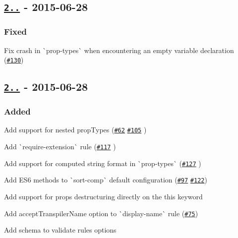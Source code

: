 \subsection*{\href{https://github.com/yannickcr/eslint-plugin-react/compare/v2.6.0...v2.6.1}{\tt 2..} -\/ 2015-\/06-\/28}

\subsubsection*{Fixed}


\begin{DoxyItemize}
\item Fix crash in \`{}prop-\/types\`{} when encountering an empty variable declaration (\href{https://github.com/yannickcr/eslint-plugin-react/issues/130}{\tt \#130})
\end{DoxyItemize}

\subsection*{\href{https://github.com/yannickcr/eslint-plugin-react/compare/v2.5.2...v2.6.0}{\tt 2..} -\/ 2015-\/06-\/28}

\subsubsection*{Added}


\begin{DoxyItemize}
\item Add support for nested prop\+Types (\href{https://github.com/yannickcr/eslint-plugin-react/issues/62}{\tt \#62} \href{https://github.com/yannickcr/eslint-plugin-react/issues/105}{\tt \#105} )
\item Add \`{}require-\/extension\`{} rule (\href{https://github.com/yannickcr/eslint-plugin-react/pull/117}{\tt \#117} )
\item Add support for computed string format in \`{}prop-\/types\`{} (\href{https://github.com/yannickcr/eslint-plugin-react/pull/127}{\tt \#127} )
\item Add E\+S6 methods to \`{}sort-\/comp\`{} default configuration (\href{https://github.com/yannickcr/eslint-plugin-react/issues/97}{\tt \#97} \href{https://github.com/yannickcr/eslint-plugin-react/issues/122}{\tt \#122})
\item Add support for props destructuring directly on the this keyword
\item Add {\ttfamily accept\+Transpiler\+Name} option to \`{}display-\/name\`{} rule (\href{https://github.com/yannickcr/eslint-plugin-react/issues/75}{\tt \#75})
\item Add schema to validate rules options
\end{DoxyItemize}

